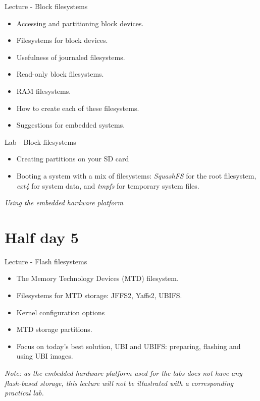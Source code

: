\documentclass[a4paper,12pt,obeyspaces,spaces,hyphens]{article}
\begin{document}
\feagendatwocolumn
{Lecture - Block filesystems}
{
  \begin{itemize}
  \item Accessing and partitioning block devices.
  \item Filesystems for block devices.
  \item Usefulness of journaled filesystems.
  \item Read-only block filesystems.
  \item RAM filesystems.
  \item How to create each of these filesystems.
  \item Suggestions for embedded systems.
  \end{itemize}
}
{Lab - Block filesystems}
{
  \begin{itemize}
  \item Creating partitions on your SD card
  \item Booting a system with a mix of filesystems: {\em SquashFS} for
    the root filesystem, {\em ext4} for system data, and {\em
      tmpfs} for temporary system files.
  \end{itemize}

  \vspace{0.5cm}
  {\em Using the embedded hardware platform}
}

\section{Half day 5}

\feagendaonecolumn
{Lecture - Flash filesystems}
{
  \begin{itemize}
  \item The Memory Technology Devices (MTD) filesystem.
  \item Filesystems for MTD storage: JFFS2, Yaffs2, UBIFS.
  \item Kernel configuration options
  \item MTD storage partitions.
  \item Focus on today's best solution, UBI and UBIFS:
	preparing, flashing and using UBI images.
  \end{itemize}

  \vspace{0.5cm}

  {\em Note: as the embedded hardware platform used for the labs does
    not have any flash-based storage, this lecture will not be
    illustrated with a corresponding practical lab.}
}
\end{document}
